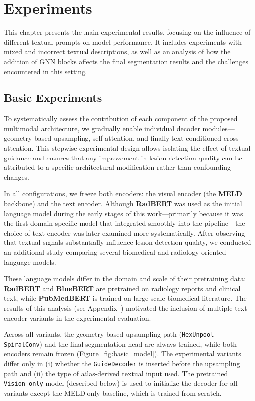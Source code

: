 \documentclass[FCD_GNN.tex]{subfiles}
\begin{document}
\chapter{Experiments}
\label{chapter:Experiments}

This chapter presents the main experimental results, focusing on the influence
of different textual prompts on model performance.
It includes experiments with mixed and incorrect textual descriptions, as well
as an analysis of how the addition of GNN blocks affects the final
segmentation results and the challenges encountered in this setting.

\section{Basic Experiments}
To systematically assess the contribution of each component of the proposed
multimodal architecture, we gradually enable individual decoder modules—
geometry-based upsampling, self-attention, and finally text-conditioned
cross-attention.
This stepwise experimental design allows isolating the effect of textual
guidance and ensures that any improvement in lesion detection quality can be
attributed to a specific architectural modification rather than confounding
changes.

In all configurations, we freeze both encoders: the visual encoder (the
\textbf{MELD} backbone) and the text encoder.
Although \textbf{RadBERT} was used as the initial language model during the early
stages of this work—primarily because it was the first domain-specific model that
integrated smoothly into the pipeline—the choice of text encoder was later
examined more systematically.
After observing that textual signals substantially influence lesion detection
quality, we conducted an additional study comparing several biomedical and
radiology-oriented language models.

These language models differ in the domain and scale of their pretraining data:
\textbf{RadBERT} and \textbf{BlueBERT} are pretrained on radiology reports and
clinical text, while \textbf{PubMedBERT} is trained on large-scale biomedical
literature.
The results of this analysis (see Appendix~)
motivated the inclusion of multiple text-encoder variants in the experimental
evaluation.

Across all variants, the geometry-based upsampling path
(\texttt{HexUnpool} + \texttt{SpiralConv}) and the final segmentation head are
always trained, while both encoders remain frozen
(Figure~\ref{fig:basic_model}).
The experimental variants differ only in (i) whether the \texttt{GuideDecoder}
is inserted before the upsampling path and (ii) the type of atlas-derived
textual input used.
The pretrained \texttt{Vision-only} model (described below) is used to initialize
the decoder for all variants except the MELD-only baseline, which is trained
from scratch.
\end{document}
